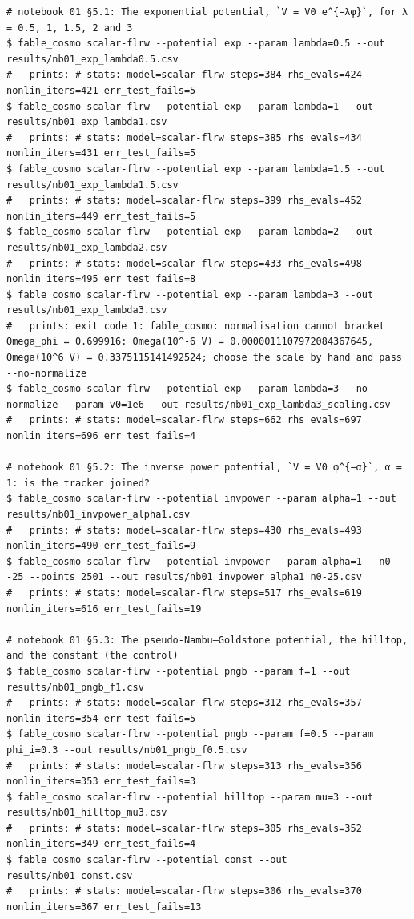 \begin{Verbatim}
# notebook 01 §5.1: The exponential potential, `V = V0 e^{−λφ}`, for λ = 0.5, 1, 1.5, 2 and 3
$ fable_cosmo scalar-flrw --potential exp --param lambda=0.5 --out results/nb01_exp_lambda0.5.csv
#   prints: # stats: model=scalar-flrw steps=384 rhs_evals=424 nonlin_iters=421 err_test_fails=5
$ fable_cosmo scalar-flrw --potential exp --param lambda=1 --out results/nb01_exp_lambda1.csv
#   prints: # stats: model=scalar-flrw steps=385 rhs_evals=434 nonlin_iters=431 err_test_fails=5
$ fable_cosmo scalar-flrw --potential exp --param lambda=1.5 --out results/nb01_exp_lambda1.5.csv
#   prints: # stats: model=scalar-flrw steps=399 rhs_evals=452 nonlin_iters=449 err_test_fails=5
$ fable_cosmo scalar-flrw --potential exp --param lambda=2 --out results/nb01_exp_lambda2.csv
#   prints: # stats: model=scalar-flrw steps=433 rhs_evals=498 nonlin_iters=495 err_test_fails=8
$ fable_cosmo scalar-flrw --potential exp --param lambda=3 --out results/nb01_exp_lambda3.csv
#   prints: exit code 1: fable_cosmo: normalisation cannot bracket Omega_phi = 0.699916: Omega(10^-6 V) = 0.0000011107972084367645, Omega(10^6 V) = 0.3375115141492524; choose the scale by hand and pass --no-normalize
$ fable_cosmo scalar-flrw --potential exp --param lambda=3 --no-normalize --param v0=1e6 --out results/nb01_exp_lambda3_scaling.csv
#   prints: # stats: model=scalar-flrw steps=662 rhs_evals=697 nonlin_iters=696 err_test_fails=4

# notebook 01 §5.2: The inverse power potential, `V = V0 φ^{−α}`, α = 1: is the tracker joined?
$ fable_cosmo scalar-flrw --potential invpower --param alpha=1 --out results/nb01_invpower_alpha1.csv
#   prints: # stats: model=scalar-flrw steps=430 rhs_evals=493 nonlin_iters=490 err_test_fails=9
$ fable_cosmo scalar-flrw --potential invpower --param alpha=1 --n0 -25 --points 2501 --out results/nb01_invpower_alpha1_n0-25.csv
#   prints: # stats: model=scalar-flrw steps=517 rhs_evals=619 nonlin_iters=616 err_test_fails=19

# notebook 01 §5.3: The pseudo-Nambu–Goldstone potential, the hilltop, and the constant (the control)
$ fable_cosmo scalar-flrw --potential pngb --param f=1 --out results/nb01_pngb_f1.csv
#   prints: # stats: model=scalar-flrw steps=312 rhs_evals=357 nonlin_iters=354 err_test_fails=5
$ fable_cosmo scalar-flrw --potential pngb --param f=0.5 --param phi_i=0.3 --out results/nb01_pngb_f0.5.csv
#   prints: # stats: model=scalar-flrw steps=313 rhs_evals=356 nonlin_iters=353 err_test_fails=3
$ fable_cosmo scalar-flrw --potential hilltop --param mu=3 --out results/nb01_hilltop_mu3.csv
#   prints: # stats: model=scalar-flrw steps=305 rhs_evals=352 nonlin_iters=349 err_test_fails=4
$ fable_cosmo scalar-flrw --potential const --out results/nb01_const.csv
#   prints: # stats: model=scalar-flrw steps=306 rhs_evals=370 nonlin_iters=367 err_test_fails=13


\end{Verbatim}
